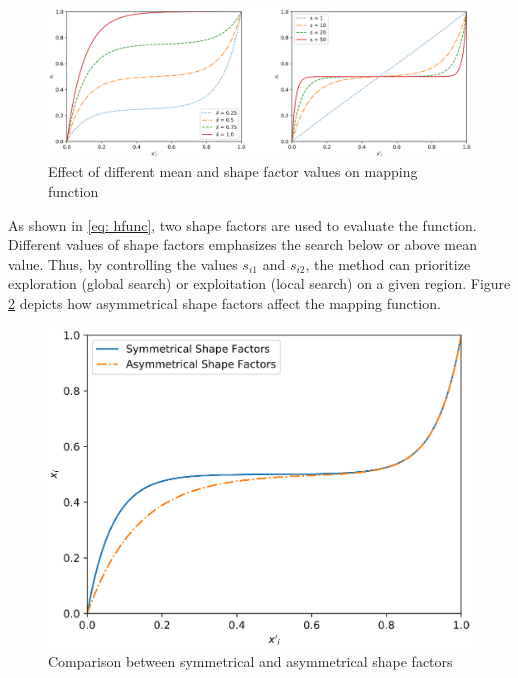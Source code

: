 \begin{figure}[h]
	\caption{Effect of different mean and shape factor values on mapping function}
	\begin{center}
		\includegraphics[scale=.5]{Images/mean_var_effects.eps}
	\end{center}
	\label{fig: mapeffects}
\end{figure}

As shown in \eqref{eq: hfunc}, two shape factors are used to evaluate the function. Different values of shape factors emphasizes the search below or above mean value. Thus, by controlling the values $s_{i1}$ and $s_{i2}$, the method can prioritize exploration (global search) or exploitation (local search) on a given region. Figure \ref{fig: diffs} depicts how asymmetrical shape factors affect the mapping function.

\begin{figure}[h]
	\caption{Comparison between symmetrical and asymmetrical shape factors}
	\begin{center}
		\includegraphics[scale=.5]{Images/symmetrical_transf.eps}
	\end{center}
	\label{fig: diffs}
\end{figure}


